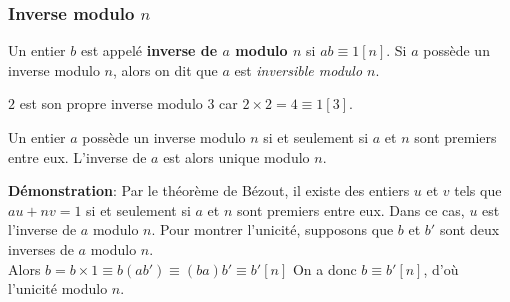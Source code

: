 



\subsubsection{Inverse modulo $n$}


\begin{dfn}
Un entier $b$ est appelé \textbf{inverse de $a$ modulo $n$} si $ab \equiv 1 [n]$. Si $a$ possède un inverse modulo $n$, alors on dit que $a$ est \textit{inversible modulo $n$}.
\end{dfn}


\begin{ex}
$2$ est son propre inverse modulo $3$ car $2 \times 2 = 4 \equiv 1 [3]$.
\end{ex}

\begin{pro}
Un entier $a$ possède un inverse modulo $n$ si et seulement si $a$ et $n$ sont premiers entre eux. L'inverse de $a$ est alors unique modulo $n$.
\end{pro}

\textbf{Démonstration}:
\newline
Par le théorème de Bézout, il existe des entiers $u$ et $v$ tels que $au + nv = 1$ si et seulement si $a$ et $n$ sont premiers entre eux. Dans ce cas, $u$ est l'inverse de $a$ modulo $n$.
\newline
Pour montrer l'unicité, supposons que $b$ et $b'$ sont deux inverses de $a$ modulo $n$. \\
Alors $b=b\times 1\equiv b(ab')\equiv (ba)b'\equiv b'[n]$
\newline
On a donc $b\equiv b'[n]$, d’où l’unicité modulo $n$.